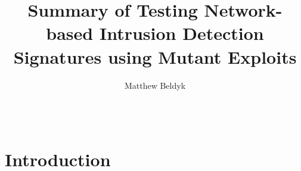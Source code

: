 \documentclass{acm_proc_article-sp}
\begin{document}
\title{Summary of Testing Network-based Intrusion Detection Signatures using Mutant Exploits}

%
\author{
    \alignauthor
    Matthew Beldyk\\
    \\
    \\
}
\maketitle
\begin{abstract}
\end{abstract}

\section{Introduction}





\end{document}
